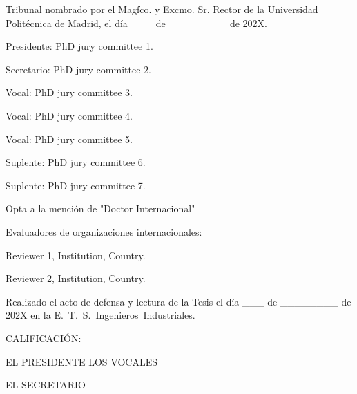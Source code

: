 
Tribunal nombrado por el Magfco. y Excmo. Sr. Rector de la Universidad Polit\'ecnica de Madrid, el d\'ia \_\_\_ de \_\_\_\_\_\_\_\_ de 202X.

\vspace{10 mm}

Presidente: PhD jury committee 1.

Secretario: PhD jury committee 2.

Vocal: PhD jury committee 3.

Vocal: PhD jury committee 4.

Vocal: PhD jury committee 5.

Suplente: PhD jury committee 6.

Suplente: PhD jury committee 7.

\vspace{10 mm}

Opta a la mención de "Doctor Internacional"

\vspace{5 mm}

Evaluadores de organizaciones internacionales:

Reviewer 1, Institution, Country.

Reviewer 2, Institution, Country.

\vspace{10 mm}

Realizado el acto de defensa y lectura de la Tesis el d\'ia \_\_\_ de \_\_\_\_\_\_\_\_ de 202X en la \mbox{E. T. S. Ingenieros Industriales}.

\vspace{10 mm}

CALIFICACI\'ON:

\vspace{10 mm}

EL PRESIDENTE \hfill LOS VOCALES

\vspace{20 mm}

\begin{center}
	EL SECRETARIO
\end{center}